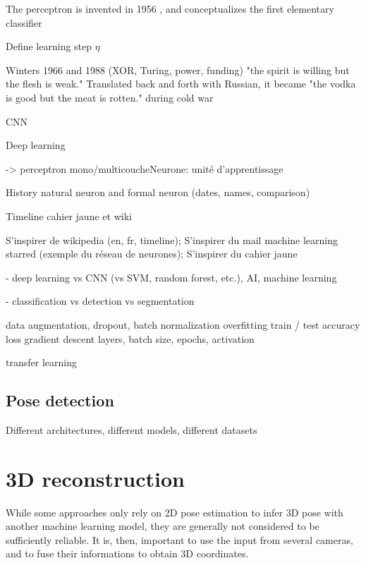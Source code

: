 The perceptron is invented in 1956 \cite{Rosenblatt1958}, and conceptualizes the first elementary classifier

Define learning step $\eta$ 

Winters 1966 and 1988 (XOR, Turing, power, funding)
"the spirit is willing but the flesh is weak." Translated back and forth with Russian, it became "the vodka is good but the meat is rotten." during cold war

CNN

Deep learning

-> perceptron mono/multicoucheNeurone: unité d'apprentissage



History natural neuron and formal neuron (dates, names, comparison)

Timeline cahier jaune et wiki

S'inspirer de wikipedia (en, fr, timeline); 
S'inspirer du mail machine learning starred (exemple du réseau de neurones); 
S'inspirer du cahier jaune


- deep learning vs CNN (vs SVM, random forest, etc.), AI, machine learning

- classification vs detection vs segmentation

data augmentation, dropout, batch normalization
overfitting
train / test
accuracy loss
gradient descent
layers, batch size, epochs, activation

transfer learning



\subsection{Pose detection}

Different architectures, different models, different datasets


\section{3D reconstruction}\label{sec:3D reconstruction}

While some approaches only rely on 2D pose estimation to infer 3D pose with another machine learning model, they are generally not considered to be sufficiently reliable. It is, then, important to use the input from several cameras, and to fuse their informations to obtain 3D coordinates.


